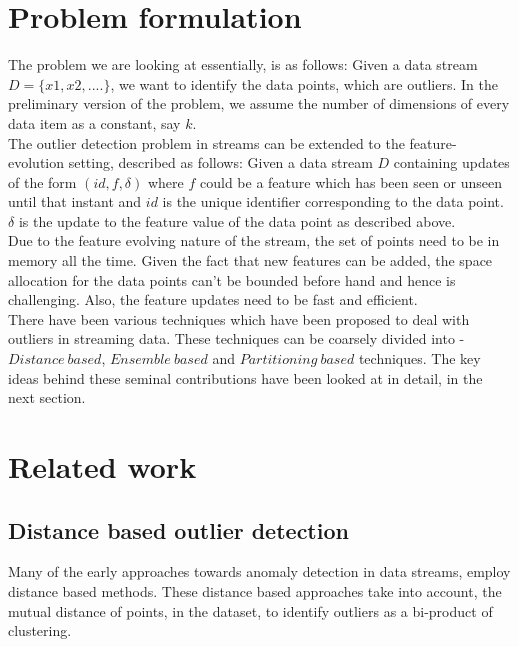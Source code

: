 \section{Problem formulation}

The problem we are looking at essentially, is as follows: Given a data stream $D = \{x1, x2, ....\}$, we want to identify the data points, which are outliers. In the preliminary version of the problem, we assume the number of dimensions of every data item as a constant, say $k$.\\

The outlier detection problem in streams can be extended to the feature-evolution setting, described as follows: Given a data stream $D$ containing updates of the form $(id, f, \delta)$ where $f$ could be a feature which has been seen or unseen until that instant and $id$ is the unique identifier corresponding to the data point. $\delta$ is the update to the feature value of the data point as described above. \\

Due to the feature evolving nature of the stream, the set of points need to be in memory all the time. Given the fact that new features can be added, the space allocation for the data points can't be bounded before hand and hence is challenging. Also, the feature updates need to be fast and efficient. \\

There have been various techniques\cite{tran2016distance}\cite{tan2011fast}\cite{aggarwal2013outlier} which have been proposed to deal with outliers in streaming data. These techniques can be coarsely divided into - $Distance\ based$, $Ensemble\ based$ and $Partitioning\ based$ techniques. The key ideas behind these seminal contributions have been looked at in detail, in the next section.

\section{Related work}

\subsection{Distance based outlier detection}

Many of the early approaches towards anomaly detection in data streams, employ distance based methods. These distance based approaches take into account, the mutual distance of points, in the dataset, to identify outliers as a bi-product of clustering. \\

